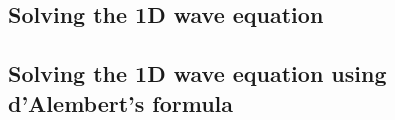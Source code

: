 \documentclass{article}
\newcommand{\red}[1]{\textcolor{red}{#1}}
\begin{document}
\subsection{Solving the 1D wave equation}

\subsection{Solving the 1D wave equation using d'Alembert's formula}
\begin{bibdiv}
\begin{biblist}
\end{biblist}
\end{bibdiv}
\end{document}
